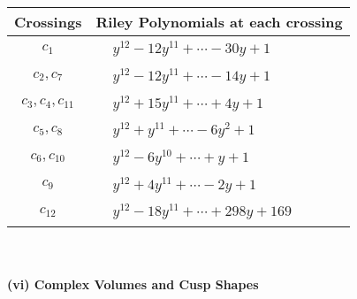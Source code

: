 \documentclass[1p]{elsarticle_modified}
\theoremstyle{definition}
\begin{document}
\begin{tabular}{m{50pt}|m{274pt}}
Crossings & \hspace{64pt}Riley Polynomials at each crossing \\
\hline $$\begin{aligned}c_{1}\end{aligned}$$&$\begin{aligned}
&y^{12}-12 y^{11}+\cdots-30 y+1
\end{aligned}$\\
\hline $$\begin{aligned}c_{2},c_{7}\end{aligned}$$&$\begin{aligned}
&y^{12}-12 y^{11}+\cdots-14 y+1
\end{aligned}$\\
\hline $$\begin{aligned}c_{3},c_{4},c_{11}\end{aligned}$$&$\begin{aligned}
&y^{12}+15 y^{11}+\cdots+4 y+1
\end{aligned}$\\
\hline $$\begin{aligned}c_{5},c_{8}\end{aligned}$$&$\begin{aligned}
&y^{12}+y^{11}+\cdots-6 y^2+1
\end{aligned}$\\
\hline $$\begin{aligned}c_{6},c_{10}\end{aligned}$$&$\begin{aligned}
&y^{12}-6 y^{10}+\cdots+y+1
\end{aligned}$\\
\hline $$\begin{aligned}c_{9}\end{aligned}$$&$\begin{aligned}
&y^{12}+4 y^{11}+\cdots-2 y+1
\end{aligned}$\\
\hline $$\begin{aligned}c_{12}\end{aligned}$$&$\begin{aligned}
&y^{12}-18 y^{11}+\cdots+298 y+169
\end{aligned}$\\
\hline
\end{tabular}\\~\\
\newpage\flushleft \textbf{(vi) Complex Volumes and Cusp Shapes}
\end{document}
